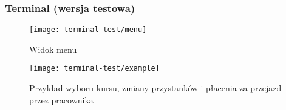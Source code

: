\subsubsection{Terminal (wersja testowa)}
\begin{figure}[H]
  \centering
  \texttt{[image: terminal-test/menu]}
  \caption{Widok menu}
\end{figure}
\begin{figure}[H]
  \centering
  \texttt{[image: terminal-test/example]}
  \caption{Przykład wyboru kursu, zmiany przystanków i płacenia za przejazd przez pracownika}
\end{figure}
